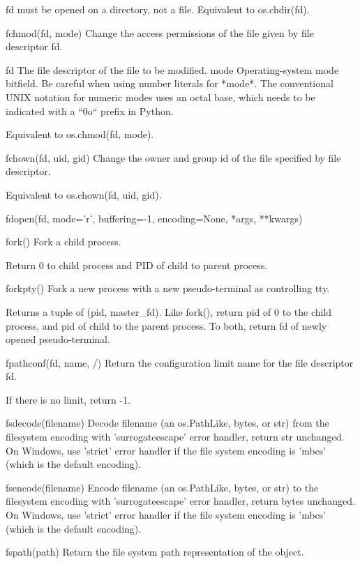 \documentclass{article}
\begin{document}
        fd must be opened on a directory, not a file.
        Equivalent to os.chdir(fd).

    fchmod(fd, mode)
        Change the access permissions of the file given by file descriptor fd.

          fd
            The file descriptor of the file to be modified.
          mode
            Operating-system mode bitfield.
            Be careful when using number literals for *mode*. The conventional UNIX notation for
            numeric modes uses an octal base, which needs to be indicated with a ``0o`` prefix in
            Python.

        Equivalent to os.chmod(fd, mode).

    fchown(fd, uid, gid)
        Change the owner and group id of the file specified by file descriptor.

        Equivalent to os.chown(fd, uid, gid).

    fdopen(fd, mode='r', buffering=-1, encoding=None, *args, **kwargs)

    fork()
        Fork a child process.

        Return 0 to child process and PID of child to parent process.

    forkpty()
        Fork a new process with a new pseudo-terminal as controlling tty.

        Returns a tuple of (pid, master_fd).
        Like fork(), return pid of 0 to the child process,
        and pid of child to the parent process.
        To both, return fd of newly opened pseudo-terminal.

    fpathconf(fd, name, /)
        Return the configuration limit name for the file descriptor fd.

        If there is no limit, return -1.

    fsdecode(filename)
        Decode filename (an os.PathLike, bytes, or str) from the filesystem
        encoding with 'surrogateescape' error handler, return str unchanged. On
        Windows, use 'strict' error handler if the file system encoding is
        'mbcs' (which is the default encoding).

    fsencode(filename)
        Encode filename (an os.PathLike, bytes, or str) to the filesystem
        encoding with 'surrogateescape' error handler, return bytes unchanged.
        On Windows, use 'strict' error handler if the file system encoding is
        'mbcs' (which is the default encoding).

    fspath(path)
        Return the file system path representation of the object.
\end{document}
